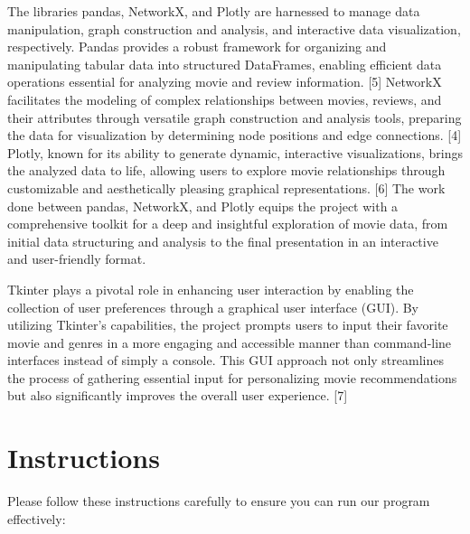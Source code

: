 \documentclass[fontsize=11pt]{article}
\begin{document}
\noindent The libraries pandas, NetworkX, and Plotly are harnessed to manage data manipulation, graph construction and analysis, and interactive data visualization, respectively. Pandas provides a robust framework for organizing and manipulating tabular data into structured DataFrames, enabling efficient data operations essential for analyzing movie and review information. [5] NetworkX facilitates the modeling of complex relationships between movies, reviews, and their attributes through versatile graph construction and analysis tools, preparing the data for visualization by determining node positions and edge connections. [4] Plotly, known for its ability to generate dynamic, interactive visualizations, brings the analyzed data to life, allowing users to explore movie relationships through customizable and aesthetically pleasing graphical representations. [6] The work done between pandas, NetworkX, and Plotly equips the project with a comprehensive toolkit for a deep and insightful exploration of movie data, from initial data structuring and analysis to the final presentation in an interactive and user-friendly format.
\vspace{0.5cm}

\noindent Tkinter plays a pivotal role in enhancing user interaction by enabling the collection of user preferences through a graphical user interface (GUI). By utilizing Tkinter's capabilities, the project prompts users to input their favorite movie and genres in a more engaging and accessible manner than command-line interfaces instead of simply a console. This GUI approach not only streamlines the process of gathering essential input for personalizing movie recommendations but also significantly improves the overall user experience. [7]

\section*{Instructions}

Please follow these instructions carefully to ensure you can run our program effectively:
\end{document}
